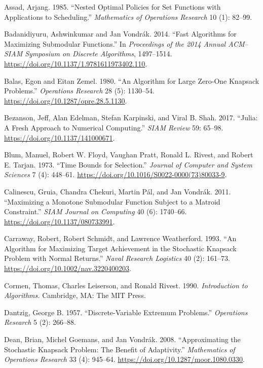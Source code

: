 \documentclass[11pt]{article} %
\theoremstyle{definition}
\theoremstyle{definition}
\begin{document}
Assad, Arjang. 1985. ``Nested Optimal Policies for Set Functions with Applications to Scheduling.'' \emph{Mathematics of Operations Research} 10 (1): 82--99.

Badanidiyuru, Ashwinkumar and Jan Vondrák. 2014. ``Fast Algorithms for Maximizing Submodular Functions.'' In \emph{Proceedings of the 2014 Annual ACM--SIAM Symposium on Discrete Algorithms}, 1497--1514. \url{https://doi.org/10.1137/1.9781611973402.110}.

Balas, Egon and Eitan Zemel. 1980. ``An Algorithm for Large Zero-One Knapsack Problems.'' \emph{Operations Research} 28 (5): 1130--54. \url{https://doi.org/10.1287/opre.28.5.1130}. 

Bezanson, Jeff, Alan Edelman, Stefan Karpinski, and Viral B. Shah. 2017. ``Julia: A Fresh Approach to Numerical Computing.'' \emph{SIAM Review} 59: 65–98. \url{https://doi.org/10.1137/141000671}.

Blum,  Manuel, Robert W. Floyd, Vaughan Pratt, Ronald L. Rivest, and Robert E. Tarjan. 1973. ``Time Bounds for Selection.'' \emph{Journal of Computer and System Sciences} 7 (4): 448--61. \url{https://doi.org/10.1016/S0022-0000(73)80033-9}.


Calinescu, Gruia, Chandra Chekuri, Martin Pál, and Jan Vondrák. 2011. ``Maximizing a Monotone Submodular Function Subject to a Matroid Constraint.'' \emph{SIAM Journal on Computing} 40 (6): 1740--66. \url{https://doi.org/10.1137/080733991}.

Carraway, Robert, Robert Schmidt, and Lawrence Weatherford. 1993. ``An Algorithm for Maximizing Target Achievement in the Stochastic Knapsack Problem with Normal Returns.'' \emph{Naval Research Logistics} 40 (2): 161--73. \url{https://doi.org/10.1002/nav.3220400203}.

Cormen, Thomas, Charles Leiserson, and Ronald Rivest. 1990. \emph{Introduction to Algorithms.} Cambridge, MA: The MIT Press.

Dantzig, George B. 1957. ``Discrete-Variable Extremum Problems.'' \emph{Operations Research} 5 (2): 266--88.

Dean, Brian, Michel Goemans, and Jan Vondr\'ak. 2008. ``Approximating the Stochastic Knapsack Problem: The Benefit of Adaptivity.'' \emph{Mathematics of Operations Research} 33 (4): 945--64. \url{https://doi.org/10.1287/moor.1080.0330}.
\end{document}
